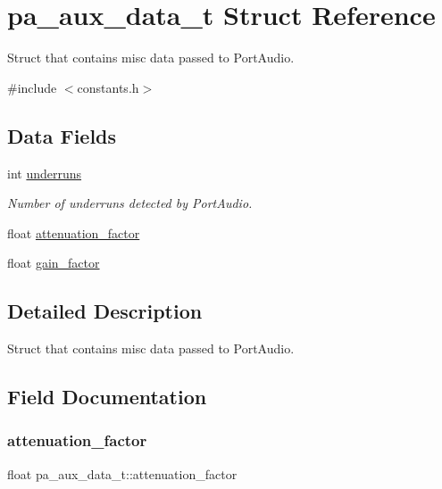 \hypertarget{structpa__aux__data__t}{}\section{pa\+\_\+aux\+\_\+data\+\_\+t Struct Reference}
\label{structpa__aux__data__t}


Struct that contains misc data passed to Port\+Audio.  




{\ttfamily \#include $<$constants.\+h$>$}

\subsection*{Data Fields}
\begin{DoxyCompactItemize}
\item 
int \mbox{\hyperlink{structpa__aux__data__t_aa3d43d6df6b87e7486d549985762081b}{underruns}}
\begin{DoxyCompactList}\small\item\em Number of underruns detected by Port\+Audio. \end{DoxyCompactList}\item 
float \mbox{\hyperlink{structpa__aux__data__t_a883cc7f0444bab007b53b6f02aaa8a12}{attenuation\+\_\+factor}}
\item 
float \mbox{\hyperlink{structpa__aux__data__t_a6410c0b0f5f07c5cd64f0ca85afc825b}{gain\+\_\+factor}}
\end{DoxyCompactItemize}


\subsection{Detailed Description}
Struct that contains misc data passed to Port\+Audio. 

\subsection{Field Documentation}
\mbox{\label{structpa__aux__data__t_a883cc7f0444bab007b53b6f02aaa8a12}} 
\subsubsection{\texorpdfstring{attenuation\+\_\+factor}{attenuation\_factor}}
{\footnotesize\ttfamily float pa\+\_\+aux\+\_\+data\+\_\+t\+::attenuation\+\_\+factor}

